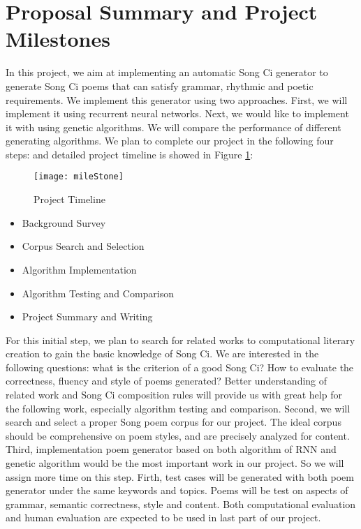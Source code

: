 \section{Proposal Summary and Project Milestones}
In this project, we aim at implementing an automatic Song Ci generator to generate Song Ci poems that can satisfy grammar, rhythmic and poetic requirements.
%
We implement this generator using two approaches. First, we will implement it using recurrent neural networks.
%
Next, we would like to implement it with using genetic algorithms.
%
We will compare the performance of different generating algorithms.
%
We plan to complete our project in the following four steps:
and detailed project timeline is showed in Figure \ref{fig:projecttimeline}:
\begin{figure}[htbp]
	\centering
	\texttt{[image: mileStone]}
	\caption{Project Timeline}
	\label{fig:projecttimeline}	
\end{figure}
\begin{itemize}
\item Background Survey
\item Corpus Search and Selection
\item Algorithm Implementation
\item Algorithm Testing and Comparison
\item Project Summary and Writing
\end{itemize}

For this initial step, we plan to search for related works to computational literary creation to gain the basic knowledge of Song Ci.
%
We are interested in the following questions: what is the criterion of a good Song Ci? How to evaluate the correctness, fluency and style of poems generated?
%
Better understanding of related work and Song Ci composition rules will provide us with great help for the following work, especially algorithm testing and comparison. 
%
Second, we will search and select a proper Song poem corpus for our project. The ideal corpus should be comprehensive on poem styles, and are precisely analyzed for content. 
%
Third, implementation poem generator based on both algorithm of RNN and genetic algorithm would be the most important work in our project. So we will assign more time on this step. 
%
Firth, test cases will be generated with both poem generator under the same keywords and topics. Poems will be test on aspects of grammar, semantic correctness, style and content. Both computational evaluation and human evaluation are expected to be used in last part of our project.



